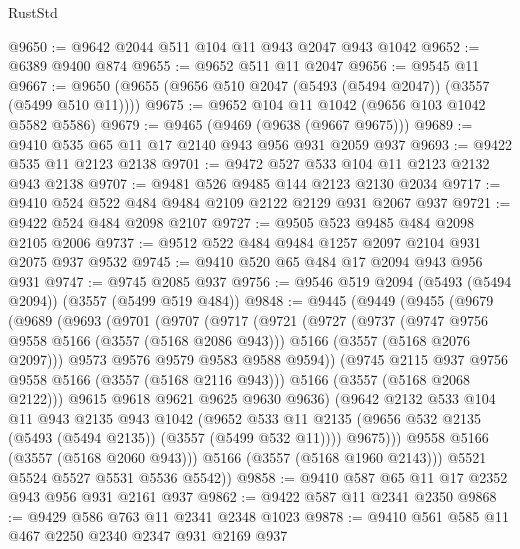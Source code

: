 \begin{lexlean}{RustStd}
\begin{coremodule}
@9650 := @9642 @2044 @511 @104 @11 @943 @2047 @943 @1042
@9652 := @6389 @9400 @874
@9655 := @9652 @511 @11 @2047
@9656 := @9545 @11
@9667 := @9650 (@9655 (@9656 @510 @2047 (@5493 (@5494 @2047)) (@3557 (@5499 @510 @11))))
@9675 := @9652 @104 @11 @1042 (@9656 @103 @1042 @5582 @5586)
@9679 := @9465 (@9469 (@9638 (@9667 @9675)))
@9689 := @9410 @535 @65 @11 @17 @2140 @943 @956 @931 @2059 @937
@9693 := @9422 @535 @11 @2123 @2138
@9701 := @9472 @527 @533 @104 @11 @2123 @2132 @943 @2138
@9707 := @9481 @526 @9485 @144 @2123 @2130 @2034
@9717 := @9410 @524 @522 @484 @9484 @2109 @2122 @2129 @931 @2067 @937
@9721 := @9422 @524 @484 @2098 @2107
@9727 := @9505 @523 @9485 @484 @2098 @2105 @2006
@9737 := @9512 @522 @484 @9484 @1257 @2097 @2104 @931 @2075 @937 @9532
@9745 := @9410 @520 @65 @484 @17 @2094 @943 @956 @931
@9747 := @9745 @2085 @937
@9756 := @9546 @519 @2094 (@5493 (@5494 @2094)) (@3557 (@5499 @519 @484))
@9848 := @9445
    (@9449
      (@9455
        (@9679
          (@9689
            (@9693
              (@9701
                (@9707
                  (@9717
                    (@9721
                      (@9727
                        (@9737
                          (@9747 @9756 @9558 @5166 (@3557 (@5168 @2086 @943)))
                          @5166
                          (@3557 (@5168 @2076 @2097)))
                        @9573
                        @9576
                        @9579
                        @9583
                        @9588
                        @9594))
                    (@9745 @2115 @937 @9756 @9558 @5166 (@3557 (@5168 @2116 @943)))
                    @5166
                    (@3557 (@5168 @2068 @2122)))
                  @9615
                  @9618
                  @9621
                  @9625
                  @9630
                  @9636)
                (@9642
                  @2132
                  @533
                  @104
                  @11
                  @943
                  @2135
                  @943
                  @1042
                  (@9652
                    @533
                    @11
                    @2135
                    (@9656 @532 @2135 (@5493 (@5494 @2135)) (@3557 (@5499 @532 @11))))
                  @9675)))
            @9558
            @5166
            (@3557 (@5168 @2060 @943)))
          @5166
          (@3557 (@5168 @1960 @2143)))
        @5521
        @5524
        @5527
        @5531
        @5536
        @5542))
@9858 := @9410 @587 @65 @11 @17 @2352 @943 @956 @931 @2161 @937
@9862 := @9422 @587 @11 @2341 @2350
@9868 := @9429 @586 @763 @11 @2341 @2348 @1023
@9878 := @9410 @561 @585 @11 @467 @2250 @2340 @2347 @931 @2169 @937

\end{coremodule}
\end{lexlean}

